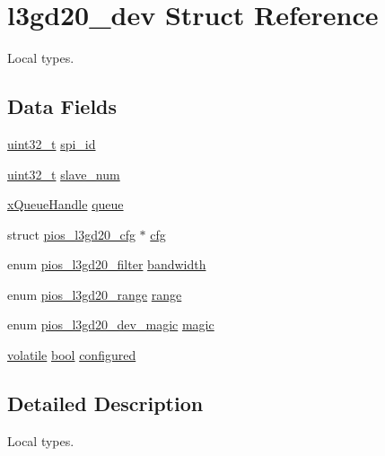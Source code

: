 \hypertarget{structl3gd20__dev}{\section{l3gd20\-\_\-dev Struct Reference}
\label{structl3gd20__dev}
}


Local types.  


\subsection*{Data Fields}
\begin{DoxyCompactItemize}
\item 
\hyperlink{stdint_8h_a435d1572bf3f880d55459d9805097f62}{uint32\-\_\-t} \hyperlink{structl3gd20__dev_a8d81d143afb3dd150d8302d4ffa9f1c5}{spi\-\_\-id}
\item 
\hyperlink{stdint_8h_a435d1572bf3f880d55459d9805097f62}{uint32\-\_\-t} \hyperlink{structl3gd20__dev_a8bf2ef5a58b8a774ee762ff497ddcd91}{slave\-\_\-num}
\item 
\hyperlink{_common_2_libraries_2_free_r_t_o_s_2_source_2include_2queue_8h_a229037f755b756156e34a440ce134b8b}{x\-Queue\-Handle} \hyperlink{structl3gd20__dev_afaf30977299d2f23c110c98529cf35f3}{queue}
\item 
struct \hyperlink{structpios__l3gd20__cfg}{pios\-\_\-l3gd20\-\_\-cfg} $\ast$ \hyperlink{structl3gd20__dev_af09c2ac64d5d4b325ba45fa55554eecb}{cfg}
\item 
enum \hyperlink{group___p_i_o_s___l3_g_d20_ga61c11c9fa344e4d6a9087dd81414d54c}{pios\-\_\-l3gd20\-\_\-filter} \hyperlink{structl3gd20__dev_a0083cd18fa543ff4b6cf593ffd4ddf19}{bandwidth}
\item 
enum \hyperlink{group___p_i_o_s___l3_g_d20_ga704696d385abb591516d2e31301dad66}{pios\-\_\-l3gd20\-\_\-range} \hyperlink{structl3gd20__dev_a76218293ab5447354c7f7f0b2772a8f3}{range}
\item 
enum \hyperlink{group___p_i_o_s___l3_g_d20_ga34e70adc9970e3e83c4d39e720087df3}{pios\-\_\-l3gd20\-\_\-dev\-\_\-magic} \hyperlink{structl3gd20__dev_abfaba1dcc53adeb1fe6ba7fdb174d78a}{magic}
\item 
\hyperlink{group___c_m_s_i_s___core___instruction_interface_gad7d93af13046b0378601b85c8c16673b}{volatile} \hyperlink{group___exported__types_gaf6a258d8f3ee5206d682d799316314b1}{bool} \hyperlink{structl3gd20__dev_a1a9fd22015b26a283f294efe6824ff51}{configured}
\end{DoxyCompactItemize}


\subsection{Detailed Description}
Local types. 

